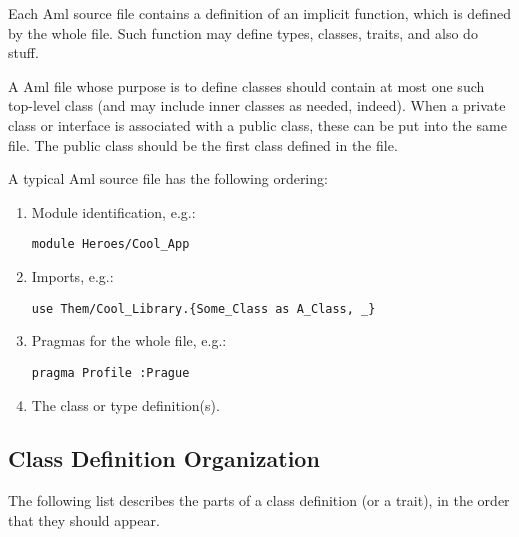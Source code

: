 Each Aml source file contains a definition of an implicit function, which is defined by the whole file. Such function may define types, classes, traits, and also do stuff. 

A Aml file whose purpose is to define classes should contain at most one such top-level class (and may include inner classes as needed, indeed). When a private class or interface is associated with a public class, these can be put into the same file. The public class should be the first class defined in the file. 

A typical Aml source file has the following ordering: 
\begin{enumerate}
  \item Module identification, e.g.:
\begin{lstlisting}
module Heroes/Cool_App
\end{lstlisting}

  \item Imports, e.g.:
\begin{lstlisting}
use Them/Cool_Library.{Some_Class as A_Class, _}
\end{lstlisting}

  \item Pragmas for the whole file, e.g.:
\begin{lstlisting}
pragma Profile :Prague
\end{lstlisting}

  \item The class or type definition(s). 
\end{enumerate}






\subsection{Class Definition Organization}

The following list describes the parts of a class definition (or a trait), in the order that they should appear. 

